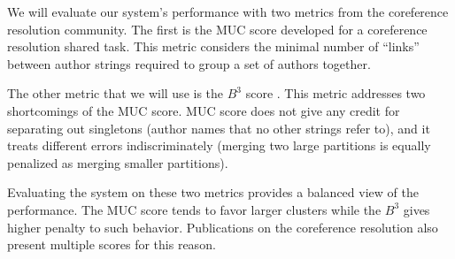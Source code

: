 \documentclass[twocolumn,letterpaper]{article}
\begin{document}
We will evaluate our system's performance with two metrics from the
coreference resolution community.  The first is the MUC score
\cite{Vilain95} developed for a coreference resolution shared task.
This metric considers the minimal number of ``links'' between author
strings required to group a set of authors together.

The other metric that we will use is the $B^3$ score \cite{Bagga98b}.
This metric addresses two shortcomings of the MUC score.  MUC score
does not give any credit for separating out singletons (author names
that no other strings refer to), and it treats different errors
indiscriminately (merging two large partitions is equally penalized as
merging smaller partitions).

Evaluating the system on these two metrics provides a balanced view of
the performance.  The MUC score tends to favor larger clusters while
the $B^3$ gives higher penalty to such behavior.  Publications on the
coreference resolution also present multiple scores for this reason.



\end{document}
